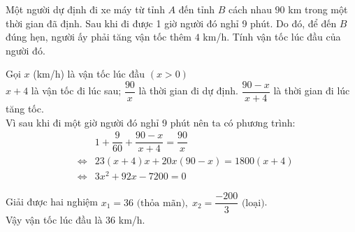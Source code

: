 \begin{bt}%
	Một người dự định đi xe máy từ tỉnh $A$ đến tỉnh $B$ cách nhau $90$ km trong một thời gian đã định. Sau khi đi được 1 giờ người đó nghỉ 9 phút. Do đó, để đến $B$ đúng hẹn, người ấy phải tăng vận tốc thêm $4$ km/h. Tính vận tốc lúc đầu của người đó.
	\loigiai
	{Gọi $x$ (km/h) là vận tốc lúc đầu $(x > 0)$\\
	$x+4$ là vận tốc đi lúc sau; $\dfrac{90}{x}$ là thời gian đi dự định.
	$\dfrac{90-x}{x+4}$ là thời gian đi lúc tăng tốc.\\
	Vì sau khi đi một giờ người đó nghỉ 9 phút nên ta có phương trình: 
	\begin{eqnarray*}
	&&1+\dfrac{9}{60}+\dfrac{90-x}{x+4}=\dfrac{90}{x}\\
	&\Leftrightarrow & 23(x+4)x+20x(90-x)=1800(x+4)\\
	&\Leftrightarrow & 3x^2+92x-7200=0
	\end{eqnarray*}
	
		Giải được hai nghiệm $x_1 = 36\mbox{ (thỏa mãn)},\;x_2 = \dfrac{-200}{3}\mbox{ (loại)}$.\\
	Vậy vận tốc lúc đầu là 36 km/h.
	

	}
\end{bt}



